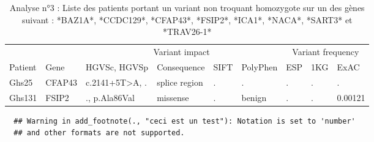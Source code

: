 \documentclass[12pt,twoside]{reedthesis}
\theoremstyle{definition}
\theoremstyle{definition}
\theoremstyle{remark}
\begin{document}
  \begin{landscape}
  \begin{longtable}[t]{lllllllll}
  \caption{\label{tab:tabgrp2moderate}Analyse n°3 : Liste des patients portant un variant non troquant homozygote sur un des gènes suivant : *BAZ1A*, *CCDC129*, *CFAP43*, *FSIP2*, *ICA1*, *NACA*, *SART3*  et  *TRAV26-1*}\\
  \toprule
  \multicolumn{1}{c}{ } & \multicolumn{1}{c}{ } & \multicolumn{4}{c}{Variant impact} & \multicolumn{3}{c}{Variant frequency} \\
  \cmidrule(l{2pt}r{2pt}){3-6} \cmidrule(l{2pt}r{2pt}){7-9}
  Patient & Gene & HGVSc, HGVSp & Consequence & SIFT & PolyPhen & ESP & 1KG & ExAC\\
  \midrule
  Ghs25 & CFAP43 & c.2141+5T>A, . & splice region & . & . & . & . & .\\
  Ghs131 & FSIP2 & ., p.Ala86Val & missense & . & benign & . & . & 0.00121\\
  \bottomrule
  \end{longtable}
  \end{landscape}
  
  \begin{verbatim}
  ## Warning in add_footnote(., "ceci est un test"): Notation is set to 'number'
  ## and other formats are not supported.
  \end{verbatim}
  
\end{document}
